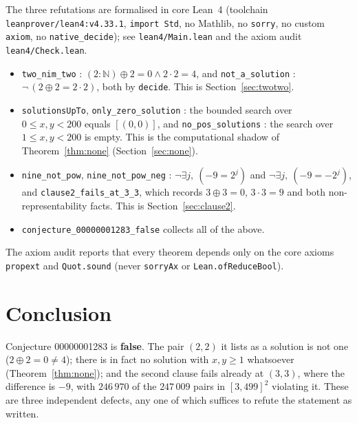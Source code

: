 \documentclass[11pt]{article}
\theoremstyle{definition}
\newcommand{\xor}{\oplus}
\begin{document}
The three refutations are formalised in core Lean~4 (toolchain
\texttt{leanprover/lean4:v4.33.1}, \texttt{import Std}, no Mathlib, no
\texttt{sorry}, no custom \texttt{axiom}, no \texttt{native\_decide}); see
\texttt{lean4/Main.lean} and the axiom audit \texttt{lean4/Check.lean}.

\begin{itemize}
  \item \texttt{two\_nim\_two} : $(2 : \mathbb{N}) \xor 2 = 0 \wedge
    2 \cdot 2 = 4$, and \texttt{not\_a\_solution} :
    $\neg\,(2 \xor 2 = 2 \cdot 2)$, both by \texttt{decide}.  This is
    Section~\ref{sec:twotwo}.
  \item \texttt{solutionsUpTo}, \texttt{only\_zero\_solution} : the bounded
    search over $0 \le x, y < 200$ equals $[(0,0)]$, and
    \texttt{no\_pos\_solutions} : the search over $1 \le x, y < 200$ is empty.
    This is the computational shadow of Theorem~\ref{thm:none}
    (Section~\ref{sec:none}).
  \item \texttt{nine\_not\_pow}, \texttt{nine\_not\_pow\_neg} :
    $\neg \exists j,\ (-9 = 2^{j})$ and $\neg \exists j,\ (-9 = -2^{j})$, and
    \texttt{clause2\_fails\_at\_3\_3}, which records $3 \xor 3 = 0$,
    $3 \cdot 3 = 9$ and both non-representability facts.  This is
    Section~\ref{sec:clause2}.
  \item \texttt{conjecture\_00000001283\_false} collects all of the above.
\end{itemize}

The axiom audit reports that every theorem depends only on the core axioms
\texttt{propext} and \texttt{Quot.sound} (never \texttt{sorryAx} or
\texttt{Lean.ofReduceBool}).

\section{Conclusion}

Conjecture 00000001283 is \textbf{false}.  The pair $(2,2)$ it lists as a
solution is not one ($2 \xor 2 = 0 \ne 4$); there is in fact no solution with
$x, y \ge 1$ whatsoever (Theorem~\ref{thm:none}); and the second clause
fails already at $(3,3)$, where the difference is $-9$, with $246\,970$ of the
$247\,009$ pairs in $[3,499]^{2}$ violating it.  These are three independent
defects, any one of which suffices to refute the statement as written.
\end{document}
